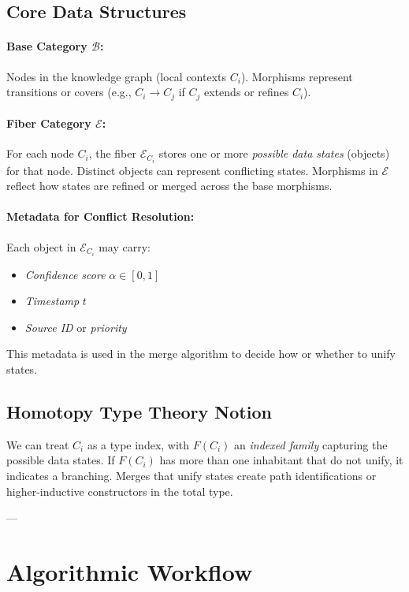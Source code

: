 \documentclass{article}
\begin{document}
\subsection{Core Data Structures}

\paragraph{Base Category $\mathcal{B}$:}  
Nodes in the knowledge graph (local contexts $C_i$). Morphisms represent transitions or covers (e.g., $C_i \to C_j$ if $C_j$ extends or refines $C_i$).

\paragraph{Fiber Category $\mathcal{E}$:}  
For each node $C_i$, the fiber $\mathcal{E}_{C_i}$ stores one or more \emph{possible data states} (objects) for that node. Distinct objects can represent conflicting states. Morphisms in $\mathcal{E}$ reflect how states are refined or merged across the base morphisms.

\paragraph{Metadata for Conflict Resolution:}  
Each object in $\mathcal{E}_{C_i}$ may carry:
\begin{itemize}
    \item \emph{Confidence score} $\alpha \in [0,1]$
    \item \emph{Timestamp} $t$
    \item \emph{Source ID} or \emph{priority}
\end{itemize}
This metadata is used in the merge algorithm to decide how or whether to unify states.

\subsection{Homotopy Type Theory Notion}

We can treat $C_i$ as a type index, with $F(C_i)$ an \emph{indexed family} capturing the possible data states. If $F(C_i)$ has more than one inhabitant that do not unify, it indicates a branching. Merges that unify states create path identifications or higher-inductive constructors in the total type.

---

\section{Algorithmic Workflow}
\label{sec:algorithmic}
\end{document}
